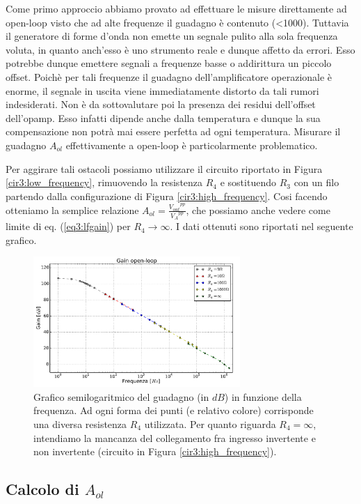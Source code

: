 Come primo approccio abbiamo provato ad effettuare le misure direttamente ad open-loop visto che ad alte frequenze il guadagno è contenuto (\num{<1000}).
Tuttavia il generatore di forme d'onda non emette un segnale pulito alla sola frequenza voluta, in quanto anch'esso è uno strumento reale e dunque affetto da errori.
Esso potrebbe dunque emettere segnali a frequenze basse o addirittura un piccolo offset.
Poichè per tali frequenze il guadagno dell'amplificatore operazionale è enorme, il segnale in uscita viene immediatamente distorto da tali rumori indesiderati.
Non è da sottovalutare poi la presenza dei residui dell'offset dell'opamp.
Esso infatti dipende anche dalla temperatura e dunque la sua compensazione non potrà mai essere perfetta ad ogni temperatura.
Misurare il guadagno $A_{ol}$ effettivamente a open-loop è particolarmente problematico.

Per aggirare tali ostacoli possiamo utilizzare il circuito riportato in Figura \ref{cir3:low_frequency}, rimuovendo la resistenza $R_4$ e sostituendo $R_3$ con un filo partendo dalla configurazione di Figura \ref{cir3:high_frequency}.
Cosi facendo otteniamo la semplice relazione $A_{ol}=\frac{{V_{out}}^{pp}}{{V_A}^{pp}}$, che possiamo anche vedere come limite di eq. (\ref{eq3:lfgain}) per $R_4 \rightarrow \infty$.
I dati ottenuti sono riportati nel seguente grafico. 

\begin{figure}[h]
	\centering
	\includegraphics[width=0.7\textwidth]{../E03/latex/gol.pdf}
	\caption{Grafico semilogaritmico del guadagno (in $dB$) in funzione della frequenza. Ad ogni forma dei punti (e relativo colore) corrisponde una diversa resistenza $R_4$ utilizzata. Per quanto riguarda $R_4=\infty$, intendiamo la mancanza del collegamento fra ingresso invertente e non invertente (circuito in Figura \ref{cir3:high_frequency}).}
  \label{cir3:gain_open_loop}
\end{figure}

\subsection{Calcolo di $A_{ol}$}

